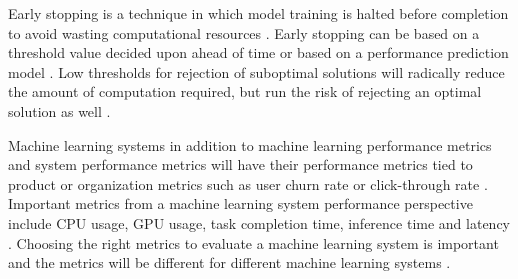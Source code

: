 Early stopping is a technique in which model training is halted before completion to avoid wasting computational resources \parencite{precheltAutomaticEarlyStopping1998}. Early stopping can be based on a threshold value decided upon ahead of time or based on a performance prediction model \parencite{bakerAcceleratingNeuralArchitecture2017}. Low thresholds for rejection of suboptimal solutions will radically reduce the amount of computation required, but run the risk of rejecting an optimal solution as well \parencite{bakerAcceleratingNeuralArchitecture2017}.

Machine learning systems in addition to machine learning performance metrics and system performance metrics will have their performance metrics tied to product or organization metrics such as user churn rate or click-through rate \parencite{shankarOperationalizingMachineLearning2022}. Important metrics from a machine learning system performance perspective include CPU usage, GPU usage, task completion time, inference time and latency \parencite{cardososilvaBenchmarkingMachineLearning2020}. Choosing the right metrics to evaluate a machine learning system is important and the metrics will be different for different machine learning systems \parencite{shankarOperationalizingMachineLearning2022}.